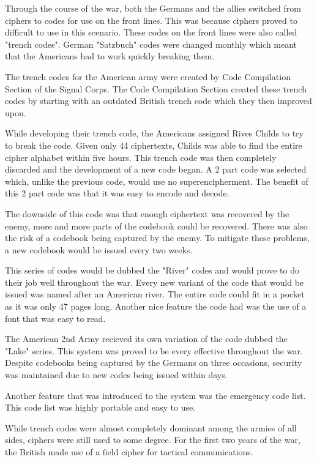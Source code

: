 \documentclass{article}
\begin{document}
    Through the course of the war, both the Germans and the allies
    switched from ciphers to codes for use on the front lines. This was because
    ciphers proved to difficult to use in this scenario. These codes on the front
    lines were also called "trench codes".
    German "Satzbuch" codes were changed monthly which meant that the Americans
    had to work quickly breaking them.

    The trench codes for the American army were created by Code Compilation Section
    of the Signal Corps. The Code Compilation Section created these trench codes
    by starting with an outdated British trench code which they then improved upon.

    While developing their trench code, the Americans assigned Rives Childs to
    try to break the code. Given only 44 ciphertexts, Childs was able to find
    the entire cipher alphabet within five hours.
    This trench code was then completely discarded and the development of a new code began.
    A 2 part code was selected which, unlike the previous code, would use no superencipherment.
    The benefit of this 2 part code was that it was easy to encode and decode.

    The downside of this code was that enough ciphertext was recovered by the enemy,
    more and more parts of the codebook could be recovered.
    There was also the risk of a codebook being captured by the enemy.
    To mitigate these problems, a new codebook would be issued every two weeks.

    This series of codes would be dubbed the "River" codes and would prove
    to do their job well throughout the war. Every new variant of the code
    that would be issued was named after an American river. The entire
    code could fit in a pocket as it was only 47 pages long.
    Another nice feature the code had was the use of a font that was easy to read.

    The American 2nd Army recieved its own variation of the code dubbed the "Lake" series.
    This system was proved to be every effective throughout the war.
    Despite codebooks being captured by the Germans on three occasions,
    security was maintained due to new codes being issued within days.

    Another feature that was introduced to the system was the emergency code list.
    This code list was highly portable and easy to use.

    While trench codes were almost completely dominant among the armies of all sides,
    ciphers were still used to some degree.
    For the first two years of the war, the British made use of a field cipher
    for tactical communications.
\end{document}
